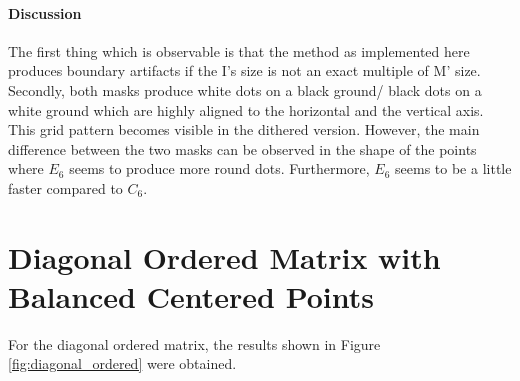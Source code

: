 \documentclass{article}
\begin{document}
\paragraph{Discussion} The first thing which is observable is that the method as implemented here produces boundary artifacts if the \textsf{I}'s size is not an exact multiple of \textsf{M}' size. Secondly, both masks produce white dots on a black ground/ black dots on a white ground which are highly aligned to the horizontal and the vertical axis. This grid pattern becomes visible in the dithered version. However, the main difference between the two masks can be observed in the shape of the points where $E_6$ seems to produce more round dots.
Furthermore, $E_6$ seems to be a little faster compared to $C_6$.

\section{Diagonal Ordered Matrix with Balanced Centered Points}
For the diagonal ordered matrix, the results shown in Figure \ref{fig:diagonal_ordered} were obtained. 
\end{document}
